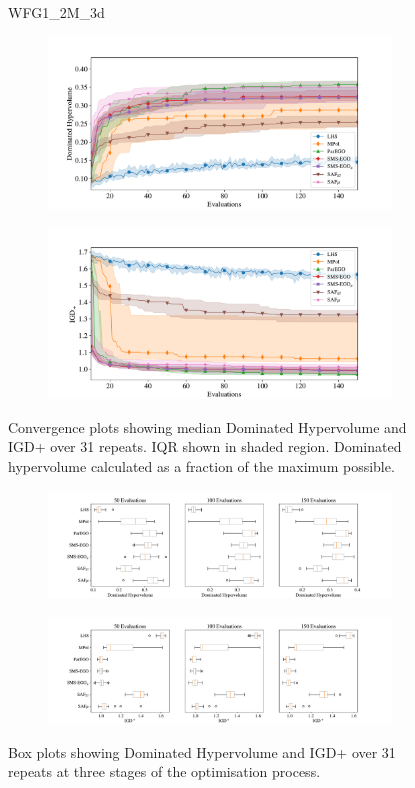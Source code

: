 \documentclass[conference]{IEEEtran}
\begin{document}
\begin{figure}
WFG1\_2M\_3d

\begin{subfigure}[hbt!]{\linewidth}

    \centering
    \includegraphics[width=0.7\linewidth]{figures/wfg1_2obj_3dim_hv_plot.pdf}
\end{subfigure}
\begin{subfigure}[h]{\linewidth}
    \centering
    \includegraphics[width=0.7\linewidth]{figures/wfg1_2obj_3dim_igd_plot.pdf}
\end{subfigure}
    \caption{Convergence plots showing median Dominated Hypervolume and IGD+ over 31 repeats. IQR shown in shaded region. Dominated hypervolume calculated as a fraction of the maximum possible.}
\vspace{\floatsep}
\begin{subfigure}[t]{\linewidth}
    \centering
    \includegraphics[width=0.8\linewidth]{figures/wfg1_2obj_3dim_hv_boxplot.pdf}
\end{subfigure}
\begin{subfigure}[t]{\linewidth}
    \centering
    \includegraphics[width=0.8\linewidth]{figures/wfg1_2obj_3dim_igd_boxplot.pdf}
\end{subfigure}
    \caption{Box plots showing Dominated Hypervolume and IGD+ over 31 repeats at three stages of the optimisation process.}
\end{figure}
\clearpage
\end{document}
